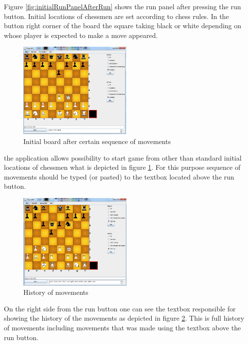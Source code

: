 \documentclass[pdftex]{article}
\begin{document}
Figure \ref{fig:initialRunPanelAfterRun} shows the run panel after pressing the run button. Initial locations of chessmen are set according to chess rules. In the button right corner of the board the square taking black or white depending on whose player is expected to make a move appeared.

\begin{figure}[!htb]
	\centering
	\includegraphics[width=0.5\textwidth]{chessImages/withHistory.png} 
	\caption{Initial board after certain sequence of movements}
	\label{fig:runPanelWithHistory}
\end{figure}

the application allows possibility to start game from other than standard initial locations of chessmen what is depicted in figure \ref{fig:runPanelWithHistory}. For this purpose sequence of movements should be typed (or pasted) to the textbox located above the run button.


\begin{figure}[!htb]
	\centering
	\includegraphics[width=0.5\textwidth]{chessImages/withHistoryAndGameHistory.png} 
	\caption{History of movements}
	\label{fig:runPanelWithMovementsHistory}
\end{figure}

On the right side from the run button one can see the textbox responsible for showing the history of the movements as depicted in figure \ref{fig:runPanelWithMovementsHistory}. This is full history of movements including movements that was made using the textbox above the run button.
\end{document}
